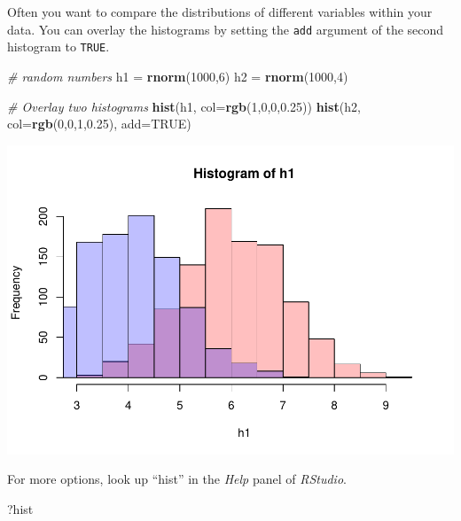 \documentclass[
]{book}
\newenvironment{Shaded}{\begin{snugshade}}{\end{snugshade}}
\newcommand{\CommentTok}[1]{\textcolor[rgb]{0.56,0.35,0.01}{\textit{#1}}}
\newcommand{\DataTypeTok}[1]{\textcolor[rgb]{0.13,0.29,0.53}{#1}}
\newcommand{\DecValTok}[1]{\textcolor[rgb]{0.00,0.00,0.81}{#1}}
\newcommand{\FloatTok}[1]{\textcolor[rgb]{0.00,0.00,0.81}{#1}}
\newcommand{\KeywordTok}[1]{\textcolor[rgb]{0.13,0.29,0.53}{\textbf{#1}}}
\newcommand{\NormalTok}[1]{#1}
\newcommand{\OtherTok}[1]{\textcolor[rgb]{0.56,0.35,0.01}{#1}}
\newcommand{\StringTok}[1]{\textcolor[rgb]{0.31,0.60,0.02}{#1}}
\begin{document}
Often you want to compare the distributions of different variables within your data. You can overlay the histograms by setting the \texttt{add} argument of the second histogram to \texttt{TRUE}.

\begin{Shaded}
\begin{Highlighting}[]
\CommentTok{# random numbers}
\NormalTok{h1 =}\StringTok{ }\KeywordTok{rnorm}\NormalTok{(}\DecValTok{1000}\NormalTok{,}\DecValTok{6}\NormalTok{)}
\NormalTok{h2 =}\StringTok{ }\KeywordTok{rnorm}\NormalTok{(}\DecValTok{1000}\NormalTok{,}\DecValTok{4}\NormalTok{)}

\CommentTok{# Overlay two histograms}
\KeywordTok{hist}\NormalTok{(h1,}
     \DataTypeTok{col=}\KeywordTok{rgb}\NormalTok{(}\DecValTok{1}\NormalTok{,}\DecValTok{0}\NormalTok{,}\DecValTok{0}\NormalTok{,}\FloatTok{0.25}\NormalTok{))}
\KeywordTok{hist}\NormalTok{(h2,}
     \DataTypeTok{col=}\KeywordTok{rgb}\NormalTok{(}\DecValTok{0}\NormalTok{,}\DecValTok{0}\NormalTok{,}\DecValTok{1}\NormalTok{,}\FloatTok{0.25}\NormalTok{),}
     \DataTypeTok{add=}\OtherTok{TRUE}\NormalTok{)}
\end{Highlighting}
\end{Shaded}

\includegraphics{_main_files/figure-latex/unnamed-chunk-132-1.pdf}

For more options, look up ``hist'' in the \emph{Help} panel of \emph{RStudio}.

\begin{Shaded}
\begin{Highlighting}[]
\NormalTok{?hist}
\end{Highlighting}
\end{Shaded}
\end{document}
